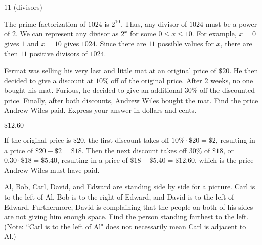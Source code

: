 \documentclass[11pt]{article}
\begin{document}
\begin{answer}
$\boxed{11}$ (divisors)
\end{answer}

\begin{solution}
The prime factorization of $1024$ is $2^{10}$. Thus, any divisor of $1024$ must be a power of $2$. We can represent any divisor as $2^x$ for some $0 \le x \le 10$. For example, $x=0$ gives $1$ and $x=10$ gives $1024$. Since there are $11$ possible values for $x$, there are then $\boxed{11}$ positive divisors of $1024$. 
\end{solution}


\begin{problem} %
Fermat was selling his very last and little mat at an original price of $\$20$. He then decided to give a discount at $10\%$ off of the original price. After 2 weeks, no one bought his mat. Furious, he decided to give an additional $30\%$ off the discounted price. Finally, after both discounts, Andrew Wiles bought the mat. Find the price Andrew Wiles paid. Express your answer in dollars and cents.
\end{problem}

\begin{answer}
$\boxed{\$12.60}$
\end{answer}

\begin{solution}
If the original price is $\$20$, the first discount takes off $10\% \cdot \$20  = \$2$, resulting in a price of $\$20 - \$2 = \$18$. Then the next discount takes off $30\%$ of $\$18$, or $0.30 \cdot \$18 = \$5.40$, resulting in a price of $\$18 - \$5.40 = \boxed{\$12.60}$, which is the price Andrew Wiles must have paid. 
\end{solution}


\begin{problem}

Al, Bob, Carl, David, and Edward are standing side by side for a picture. Carl is to the left of Al, Bob is to the right of Edward, and David is to the left of Edward. Furthermore, David is complaining that the people on both of his sides are not giving him enough space. Find the person standing farthest to the left. (Note: ``Carl is to the left of Al" does not necessarily mean Carl is adjacent to Al.)
\end{problem}
\end{document}
